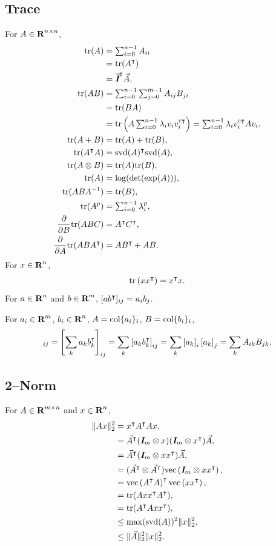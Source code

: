 \documentclass{article}
\begin{document}
\subsection{Trace}
    For $A\in\textbf{R}^{n\times n}$,
    \begin{align*}
        \text{tr}(A)&=\textstyle\sum_{i=0}^{n-1} A_{ii}\\
        &=\text{tr}(A^\intercal)\\
        &=\vec{\emph{\textbf{I}}}^\intercal\vec{A},\\
        \text{tr}(AB)&=\textstyle\sum_{i=0}^{n-1}\sum_{j=0}^{m-1}A_{ij}B_{ji}\\
        &=\text{tr}(BA)\\
        &=\text{tr}\left(A\textstyle
        \sum_{i=0}^{n-1}\lambda_i v_iv_i^{\text{c}\intercal}\right)=\textstyle\sum_{i=0}^{n-1}\lambda_i v_i^{\text{c}\intercal} A v_i,\\
        \text{tr}(A+B)&=\text{tr}(A)+\text{tr}(B),\\
        \text{tr}(A^\intercal A)&=\text{svd}(A)^\intercal \text{svd}(A),\\
        \text{tr}(A\otimes B)&=\text{tr}(A)\text{tr}(B),\\
        \text{tr}(A)&=\log(\det(\exp(A))),\\
        \text{tr}(ABA^{-1})&=\text{tr}(B),\\
        \text{tr}(A^p)&=\textstyle\sum_{i=0}^{n-1}\lambda_i^p,\\
        \frac{\partial }{\partial B}\text{tr}(ABC)&=A^\intercal C^\intercal,\\
        \frac{\partial }{\partial A}\text{tr}(ABA^\intercal)&=AB^\intercal+AB.
    \end{align*}
    For $x\in\textbf{R}^n$,
    \begin{align*}
        \text{tr}\left(xx^\intercal\right)=x^\intercal x.
    \end{align*}
    For $a\in\textbf{R}^n$ and $b\in\textbf{R}^m$, $[ab^\intercal]_{ij} = a_ib_j$.

    For $a_i\in\textbf{R}^m$,
    $b_i\in\textbf{R}^n$, 
    $A=\text{col}\{a_i\}_i$, $B=\text{col}\{b_i\}_i$,
    \begin{align*}
        [AB^\tp]_{ij}
    =\left[\sum_k a_kb_k^\tp\right]_{ij}
        =\sum_k\left[a_kb_k^\tp\right]_{ij}
        = \sum_k \left[a_k\right]_i\left[a_k\right]_j
        = \sum_k A_{ik}B_{jk}.
    \end{align*}
\subsection{2--Norm}
    For $A\in\textbf{R}^{m\times n}$ and $x\in\textbf{R}^{n}$,
    \begin{align*}
        \|Ax\|_2^2&=x^\intercal A^\intercal A x,\\
        &=\vec{A}^\intercal (\emph{\textbf{I}}_m\otimes x)(\emph{\textbf{I}}_m\otimes x^\intercal) \vec{A},\\
        &=\vec{A}^\intercal(\emph{\textbf{I}}_m\otimes xx^\intercal)\vec{A},\\
        &=(\vec{A}^\intercal\otimes\vec{A}^\intercal)\mathrm{vec}\left(\emph{\textbf{I}}_m\otimes xx^\intercal\right),\\
        &=\mathrm{vec}\left(A^\intercal A\right)^\intercal\mathrm{vec}\left(xx^\intercal\right),\\
        &=\text{tr}(Axx^\intercal A^\intercal),\\
        &=\text{tr}(A^\intercal A x x^\intercal),\\
        &\leq\max(\text{svd}(A))^2\|x\|_2^2,\\
        &\leq\|\vec{A}\|_2^2\|x\|_2^2.
    \end{align*}
\end{document}
